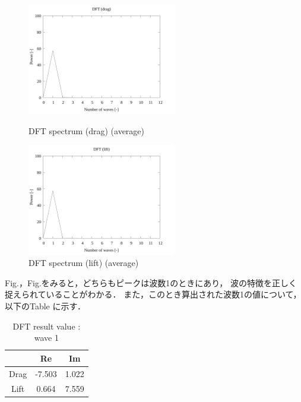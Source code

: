 \begin{figure}
        \begin{minipage}[b]{0.45\linewidth}
        \centering
        \includegraphics[width=65mm]{../../02_workspace/result/2-ex/plot/07/07-3_dft-drag.png}
        \caption{DFT spectrum (drag) (average)}
      \end{minipage}
      \begin{minipage}[b]{0.45\linewidth}
        \centering
        \includegraphics[width=65mm]{../../02_workspace/result/2-ex/plot/07/07-4_dft-lift.png}
        \caption{DFT spectrum (lift) (average)}
      \end{minipage}
\end{figure}

Fig.，Fig.をみると，どちらもピークは波数1のときにあり，
波の特徴を正しく捉えられていることがわかる．
また，このとき算出された波数1の値について，以下のTable に示す．

\begin{table}[htbp]
  \begin{center}
      \caption{DFT result value : wave 1}
      \begin{tabular}{|p{30mm}|p{20mm}|p{20mm}|}
          \hline
          \multicolumn{1}{|c|}{}     & \multicolumn{1}{|c|}{Re}    & \multicolumn{1}{|c|}{Im}   \\ \hline
          \multicolumn{1}{|c|}{Drag} & \multicolumn{1}{|c|}{-7.503} & \multicolumn{1}{|c|}{1.022}  \\ \hline
          \multicolumn{1}{|c|}{Lift} & \multicolumn{1}{|c|}{0.664}  & \multicolumn{1}{|c|}{7.559} \\ \hline
      \end{tabular}
  \end{center}
\end{table}

